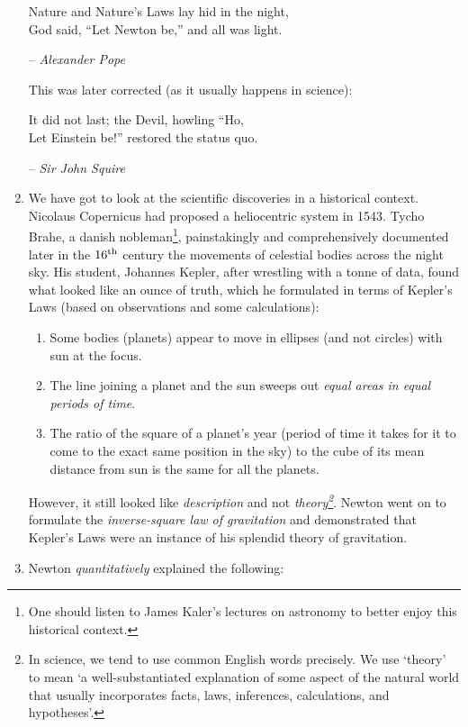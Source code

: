 \documentclass[12pt,a4paper]{book}
\begin{document}
\begin{enumerate}
        \epigraph{
            Nature and Nature's Laws lay hid in the night,\\
            God said, ``Let Newton be,'' and all was light.
        }
        {
            -- \textit{Alexander Pope}
        }

    This was later corrected (as it usually happens in science): 
        \epigraph{
            It did not last; the Devil, howling ``Ho,\\
            Let Einstein be!'' restored the status quo.
        } 
        {
            -- \textit{Sir John Squire}
        }

    \item We have got to look at the scientific discoveries in a historical context. Nicolaus Copernicus had proposed \cite{copernicus} a heliocentric system in 1543. Tycho Brahe, a danish nobleman\footnote{One should listen to James Kaler's lectures on astronomy to better enjoy this historical context.}, painstakingly and comprehensively documented later in the $16\textsuperscript{th}$ century the movements of celestial bodies across the night sky. His student, Johannes Kepler, after wrestling with a tonne of data, found what looked like an ounce of truth, which he formulated in terms of Kepler's Laws (based on observations and some calculations):
        \begin{enumerate}
            \item Some bodies (planets) appear to move in ellipses (and not circles) with sun at the focus.
            \item The line joining a planet and the sun sweeps out \emph{equal areas in equal periods of time}.
            \item The ratio of the square of a planet's year (period of time it takes for it to come to the exact same position in the sky) to the cube of its mean distance from sun is the same for all the planets.
        \end{enumerate}
        However, it still looked like \emph{description} and not \emph{theory\footnote{In science, we tend to use common English words precisely. We use `theory' to mean `a well-substantiated explanation of some aspect of the natural world that usually incorporates facts, laws, inferences, calculations, and hypotheses'.}}. Newton went on to formulate the \emph{inverse-square law of gravitation} and demonstrated that Kepler's Laws were an instance of his splendid theory of gravitation.
    \item Newton \emph{quantitatively} explained the following:

\end{enumerate}
\end{document}
